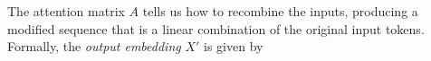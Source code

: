 \documentclass{article}
\newcommand{\ta}{\mathtt{a}}
\newcommand{\tb}{\mathtt{b}}
\newcommand{\tE}{\mathtt{E}}
\newcommand{\tP}{\mathtt{P}}
\newcommand{\by}{\times}
\begin{document}
The attention matrix $A$ tells us how to recombine the inputs,
producing a modified sequence that is a linear combination of the
original input tokens. Formally, the \emph{output embedding} $X'$ is
given by
\end{document}
